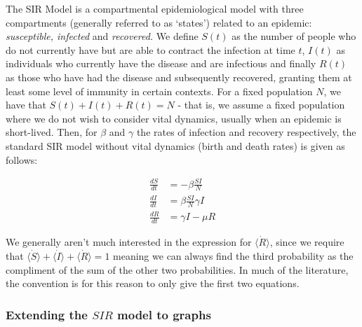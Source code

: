 \documentclass[../report.tex]{subfiles}
\begin{document}
The SIR Model is a compartmental epidemiological model with three compartments (generally referred to as `states') related to an epidemic: {\it susceptible, infected} and {\it recovered.} We define $S(t)$ as the number of people who do not currently have but are able to contract the infection at time $t$, $I(t)$ as individuals who currently have the disease and are infectious and finally $R(t)$ as those who have had the disease and subsequently recovered, granting them at least some level of immunity in certain contexts. For a fixed population $N$, we have that $S(t) + I(t) + R(t) = N$ - that is, we assume a fixed population where we do not wish to consider vital dynamics, usually when an epidemic is short-lived. Then, for $\beta$ and $\gamma$ the rates of infection and recovery respectively, the standard SIR model without vital dynamics (birth and death rates) is given as follows:

\begin{align}
\frac{dS}{dt} & = -\beta \frac{SI}{N} \label{dS}\\
\frac{dI}{dt} & = \beta\frac{SI}{N} \gamma I \label{dI}\\
\frac{dR}{dt} & = \gamma I - \mu R \label{dR}
\end{align}

We generally aren't much interested in the expression for $\dot{\langle R \rangle}$, since we require that $ \dot{\langle S \rangle} + \dot{\langle I \rangle} + \dot{\langle R \rangle} = 1$ meaning we can always find the third probability as the compliment of the sum of the other two probabilities. In much of the literature, the convention is for this reason to only give the first two equations.

\subsubsection{Extending the $SIR$ model to graphs}
\end{document}
